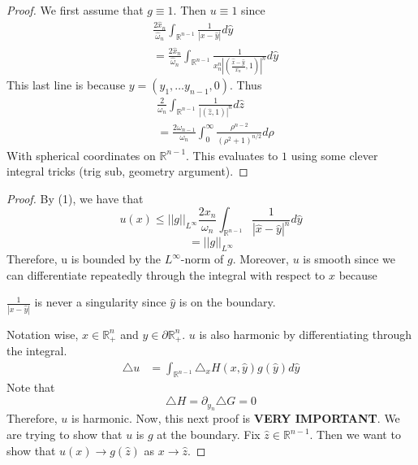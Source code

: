 \documentclass{article}
\newtheorem{one minute paper}[theorem]{One Minute Paper}
\begin{document}
\begin{proof}
    We first assume that $g \equiv 1$. Then $u \equiv 1$ since 
    \begin{align*}
        &\frac{2\hat{x}_n}{\hat{\omega}_n}\int_{\mathbb{R}^{n-1}}\frac{1}{|x - \hat{y}|}d\hat{y} \\
        &=  \frac{2\hat{x}_n}{\hat{\omega}_n}\int_{\mathbb{R}^{n-1}}\frac{1}{x_n^n|\left( \frac{\hat{x} - \hat{y}}{x_n}, 1 \right)|^n}d\hat{y}
    \end{align*}
    This last line is because $y = (y_1, \dots y_{n-1}, 0)$. Thus 
    \begin{align*}
        &\frac{2}{\omega_n}\int_{\mathbb{R}^{n-1}}\frac{1}{|(\hat{z}, 1)|^n}d\hat{z} \\
        &= \frac{2\omega_{n-1}}{\omega_n}\int_{0}^{\infty}\frac{\rho^{n-2}}{(\rho^2 + 1)^{n/2}}d\rho
    \end{align*}
    With spherical coordinates on $\mathbb{R}^{n-1}$. This evaluates to $1$ using some clever integral tricks (trig sub, geometry argument). 
\end{proof}

\begin{proof}
    By (1), we have that $$u(x) \leq ||g||_{L^{\infty}}\frac{2x_n}{\omega_n}\int_{\mathbb{R}^{n-1}}\frac{1}{|\hat{x} - \hat{y}|^{n}}d\hat{y}$$
    $$= ||g||_{L^{\infty}}$$
    Therefore, u is bounded by the $L^{\infty}$-norm of $g$. Moreover, $u$ is smooth since we can differentiate repeatedly through the integral with respect to $x$ because 
    \begin{center}
        $\frac{1}{|x - \hat{y}|}$ is never a singularity since $\hat{y}$ is on the boundary.
    \end{center}
    Notation wise, $x \in \mathbb{R}^{n}_{+}$ and $y \in \partial \mathbb{R}_{+}^{n}$. $u$ is also harmonic by differentiating through the integral. 
    \begin{align*}
        \triangle u &= \int_{\mathbb{R}^{n-1}}\triangle_x H(x,\hat{y})g(\hat{y})d\hat{y}
    \end{align*}
    Note that 
    \begin{equation}
        \triangle H = \partial_{y_n}\triangle G = 0
    \end{equation}
    Therefore, $u$ is harmonic. Now, this next proof is \textbf{VERY IMPORTANT}. We are trying to show that $u$ is $g$ at the boundary. Fix $\hat{z} \in \mathbb{R}^{n-1}$. Then we want to show that $u(x) \rightarrow g(\hat{z})$ as $x \rightarrow \hat{z}$.
\end{proof}
\end{document}
